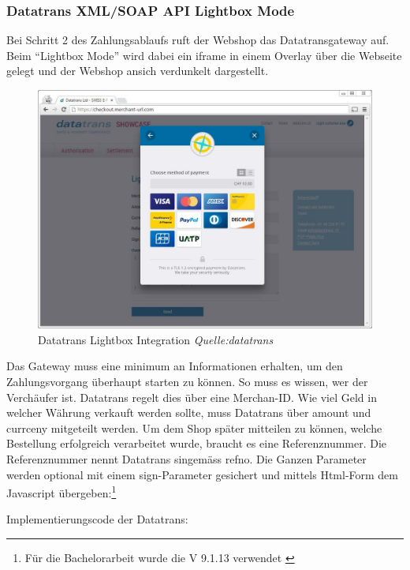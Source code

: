 \newpage

\subsubsection{Datatrans XML/SOAP API Lightbox
Mode}\label{datatrans-xmlsoap-api-lightbox-mode}

Bei Schritt 2 des Zahlungsablaufs ruft der Webshop das Datatransgateway
auf. Beim ``Lightbox Mode'' wird dabei ein iframe in einem Overlay über
die Webseite gelegt und der Webshop ansich verdunkelt dargestellt.

\begin{figure}[htbp]
\centering
\includegraphics{images/datatrans-lightbox.JPG}
\caption{Datatrans Lightbox Integration \emph{Quelle:datatrans}}
\end{figure}

Das Gateway muss eine minimum an Informationen erhalten, um den
Zahlungsvorgang überhaupt starten zu können. So muss es wissen, wer der
Verchäufer ist. Datatrans regelt dies über eine Merchan-ID. Wie viel
Geld in welcher Währung verkauft werden sollte, muss Datatrans über
amount und currceny mitgeteilt werden. Um dem Shop später mitteilen zu
können, welche Bestellung erfolgreich verarbeitet wurde, braucht es eine
Referenznummer. Die Referenznummer nennt Datatrans singemäss refno. Die
Ganzen Parameter werden optional mit einem sign-Parameter gesichert und
mittels Html-Form dem Javascript übergeben:\footnote{Für die
  Bachelorarbeit wurde die V 9.1.13 verwendet \autocite{datatrans-api}}

\newpage

Implementierungscode der Datatrans:

